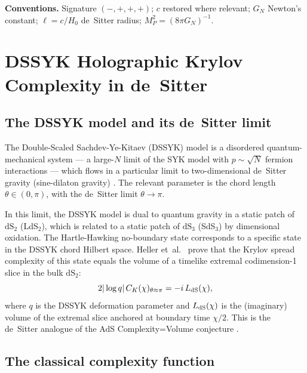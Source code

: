 \documentclass[a4paper,11pt]{article}
\newcommand{\Mpl}{M_P}                               %
\newcommand{\GN}{G_N}                                %
\begin{document}
\medskip
\noindent\textbf{Conventions.}  Signature $(-,+,+,+)$; $c$ restored where
relevant; $\GN$ Newton's constant; $\ell=c/H_0$ de~Sitter radius;
$\Mpl^2=(8\pi\GN)^{-1}$.

\section{DSSYK Holographic Krylov Complexity in de~Sitter}
\label{sec:DSSYK}

\subsection{The DSSYK model and its de~Sitter limit}

The Double-Scaled Sachdev-Ye-Kitaev (DSSYK) model is a disordered
quantum-mechanical system --- a large-$N$ limit of the SYK model with
$p\sim\sqrt{N}$ fermion interactions --- which flows in a particular limit
to two-dimensional de~Sitter gravity (sine-dilaton gravity)
\cite{Aguilar:2024,Blommaert:2024,Susskind:2022}.  The relevant parameter
is the chord length $\theta\in(0,\pi)$, with the de~Sitter limit
$\theta\to\pi$.

In this limit, the DSSYK model is dual to quantum gravity in a static patch
of $\mathrm{dS}_2$ (LdS$_2$), which is related to a static patch of
$\mathrm{dS}_3$ (SdS$_3$) by dimensional oxidation.  The Hartle-Hawking
no-boundary state corresponds to a specific state in the DSSYK chord
Hilbert space.  Heller et~al.\ \cite{Heller:2025} prove that the Krylov
spread complexity of this state equals the volume of a timelike extremal
codimension-1 slice in the bulk $\mathrm{dS}_2$:
\begin{equation}
  2|\log q|\,C_K(\chi)_{\theta\approx\pi} = -i\,L_{\rm dS}(\chi),
  \label{eq:C=V}
\end{equation}
where $q$ is the DSSYK deformation parameter and $L_{\rm dS}(\chi)$ is
the (imaginary) volume of the extremal slice anchored at boundary time
$\chi/2$.  This is the de~Sitter analogue of the AdS Complexity=Volume
conjecture \cite{Brown:2016}.

\subsection{The classical complexity function}
\end{document}
